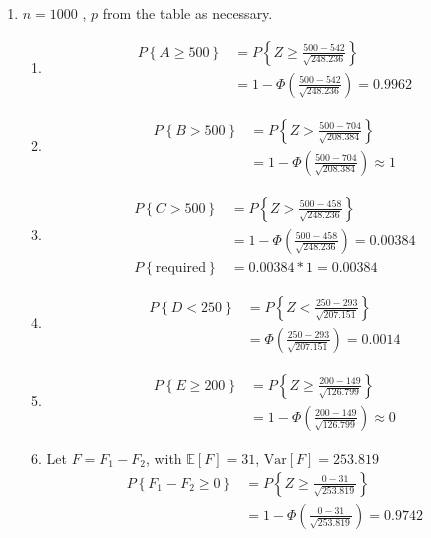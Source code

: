 \begin{enumerate}
	
	\item $ n = 1000 $ , $ p $ from the table as necessary.
	
		\begin{enumerate}
			\item 			
			\begin{align}
				P \left\{A \geq 500 \right\} &= P \left\{Z \geq \frac{500 - 542}{\sqrt{248.236}} \right\} \nonumber \\
				&= 1 - \Phi \left( \frac{500 - 542}{\sqrt{248.236}} \right) = 0.9962
			\end{align}
			
			\item 
			\begin{align}
				P \left\{B > 500 \right\} &= P \left\{Z > \frac{500 - 704}{\sqrt{208.384}} \right\} \nonumber \\
				&= 1 - \Phi \left( \frac{500 - 704}{\sqrt{208.384}} \right) \approx 1
			\end{align}
			
			\item 
			\begin{align}
				P \left\{C > 500 \right\} &= P \left\{Z > \frac{500 - 458}{\sqrt{248.236}} \right\} \nonumber \\
				&= 1 - \Phi \left( \frac{500 - 458}{\sqrt{248.236}} \right) = 0.00384 \nonumber \\
				P\left\{ \text{required} \right\} &= 0.00384 * 1 = 0.00384
			\end{align}
			
			\item 
			\begin{align}
				P \left\{D < 250 \right\} &= P \left\{Z < \frac{250 - 293}{\sqrt{207.151}} \right\} \nonumber \\
				&= \Phi \left( \frac{250 - 293}{\sqrt{207.151}} \right) = 0.0014
			\end{align}
			
			\item 
			\begin{align}
				P \left\{E \geq 200 \right\} &= P \left\{Z \geq \frac{200 - 149}{\sqrt{126.799}} \right\} \nonumber \\
				&= 1 - \Phi \left( \frac{200 - 149}{\sqrt{126.799}} \right) \approx 0
			\end{align}
			
			\item Let $ F = F_1 - F_2 $, with $ \mathbb{E}[F] = 31$, $ \mathrm{Var}[F] = 253.819$
			\begin{align}
				P \left\{F_1 - F_2 \geq 0 \right\} &= P \left\{Z \geq \frac{0 - 31}{\sqrt{253.819}} \right\} \nonumber \\
				&= 1 - \Phi \left( \frac{0 - 31}{\sqrt{253.819}} \right) = 0.9742
			\end{align}
			

\end{enumerate}
\end{enumerate}

